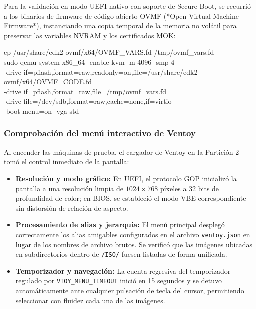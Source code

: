 \documentclass[12pt]{article}
\begin{document}
Para la validación en modo UEFI nativo con soporte de Secure Boot, se recurrió a los binarios de firmware de código abierto OVMF (*Open Virtual Machine Firmware*), instanciando una copia temporal de la memoria no volátil para preservar las variables NVRAM y los certificados MOK:

\begin{mdframed}[style=terminal]
\ttfamily\upshape\color{bashLetterColor}\footnotesize
cp /usr/share/edk2-ovmf/x64/OVMF\_VARS.fd /tmp/ovmf\_vars.fd \\
sudo qemu-system-x86\_64 -enable-kvm -m 4096 -smp 4 \\
\hspace*{1em}-drive if=pflash,format=raw,readonly=on,file=/usr/share/edk2-ovmf/x64/OVMF\_CODE.fd \\
\hspace*{1em}-drive if=pflash,format=raw,file=/tmp/ovmf\_vars.fd \\
\hspace*{1em}-drive file=/dev/sdb,format=raw,cache=none,if=virtio \\
\hspace*{1em}-boot menu=on -vga std
\end{mdframed}

\subsubsection{Comprobación del menú interactivo de Ventoy}

Al encender las máquinas de prueba, el cargador de Ventoy en la Partición 2 tomó el control inmediato de la pantalla:
\begin{itemize}[noitemsep, topsep=2pt]
    \item \textbf{Resolución y modo gráfico:} En UEFI, el protocolo GOP inicializó la pantalla a una resolución limpia de $1024 \times 768$ píxeles a 32 bits de profundidad de color; en BIOS, se estableció el modo VBE correspondiente sin distorsión de relación de aspecto.
    \item \textbf{Procesamiento de alias y jerarquía:} El menú principal desplegó correctamente los alias amigables configurados en el archivo \texttt{ventoy.json} en lugar de los nombres de archivo brutos. Se verificó que las imágenes ubicadas en subdirectorios dentro de \texttt{/ISO/} fuesen listadas de forma unificada.
    \item \textbf{Temporizador y navegación:} La cuenta regresiva del temporizador regulado por \texttt{VTOY\_MENU\_TIMEOUT} inició en 15 segundos y se detuvo automáticamente ante cualquier pulsación de tecla del cursor, permitiendo seleccionar con fluidez cada una de las imágenes.
\end{itemize}
\end{document}
